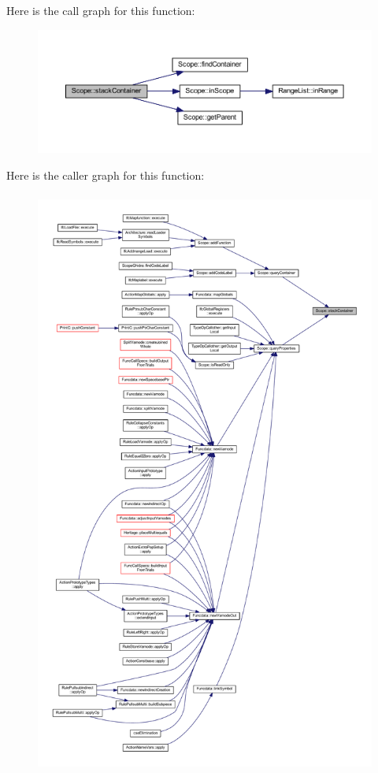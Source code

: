 Here is the call graph for this function\+:
\nopagebreak
\begin{figure}[H]
\begin{center}
\leavevmode
\includegraphics[width=350pt]{class_scope_a63e00dad81427a8595cf7bf13d8e1e0d_cgraph}
\end{center}
\end{figure}
Here is the caller graph for this function\+:
\nopagebreak
\begin{figure}[H]
\begin{center}
\leavevmode
\includegraphics[height=550pt]{class_scope_a63e00dad81427a8595cf7bf13d8e1e0d_icgraph}
\end{center}
\end{figure}
\mbox{\label{class_scope_a44898a2294de74a77dd21583ca6254e2}} 
